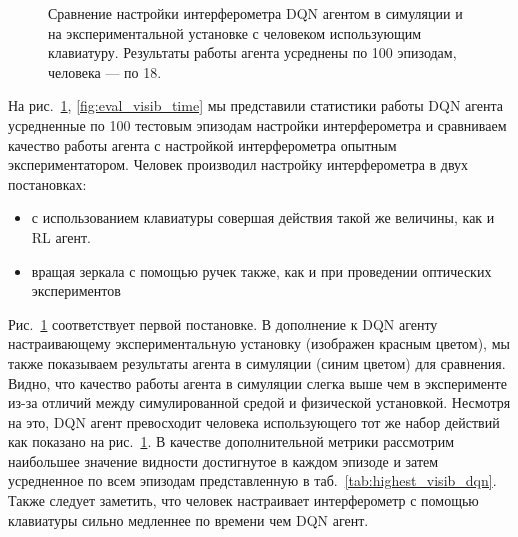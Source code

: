 \begin{figure}[ht]
\caption{Сравнение настройки интерферометра DQN агентом в симуляции и на экспериментальной установке с человеком использующим клавиатуру. Результаты работы агента усреднены по 100 эпизодам, человека --- по 18.}
\label{fig:eval_visib_step}
\end{figure}

На рис.~\ref{fig:eval_visib_step}, \ref{fig:eval_visib_time} мы представили статистики работы DQN агента усредненные по 100 тестовым эпизодам настройки интерферометра и сравниваем качество работы агента с настройкой интерферометра опытным экспериментатором. Человек производил настройку интерферометра в двух постановках:  

\begin{itemize}
    \item с использованием клавиатуры совершая действия такой же величины, как и RL агент. 
    \item вращая зеркала с помощью ручек также, как и при проведении оптических экспериментов
\end{itemize}

Рис.~\ref{fig:eval_visib_step} соответствует первой постановке. В дополнение к DQN агенту настраивающему экспериментальную установку (изображен красным цветом), мы также показываем результаты агента в симуляции (синим цветом) для сравнения. Видно, что качество работы агента в симуляции слегка выше чем в эксперименте из-за отличий между симулированной средой и физической установкой. Несмотря на это, DQN агент превосходит человека использующего тот же набор действий как показано на рис.~\ref{fig:eval_visib_step}. В качестве дополнительной метрики рассмотрим наибольшее значение видности достигнутое в каждом эпизоде и затем усредненное по всем эпизодам представленную в таб.~\ref{tab:highest_visib_dqn}. Также следует заметить, что человек настраивает интерферометр с помощью клавиатуры сильно медленнее по времени чем DQN агент. 

